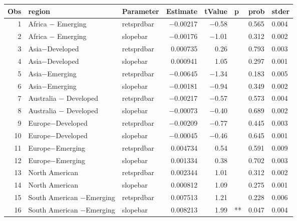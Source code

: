 

\begin{longtable}{|r|l|l|r|r|l|l|l|}\hline
   Obs &    region &    Parameter &    Estimate &    tValue &    p &    prob &    stder\\\hline
\endhead
   1 &    Africa $-$ Emerging &    retsprdbar &    $-$0.00217 &    $-$0.58 &      &    0.565 &    0.004\\\hline
   2 &    Africa $-$ Emerging &    slopebar &    $-$0.00176 &    $-$1.01 &      &    0.312 &    0.002\\\hline
   3 &    Asia$-$Developed &    retsprdbar &    0.000735 &    0.26 &      &    0.793 &    0.003\\\hline
   4 &    Asia$-$Developed &    slopebar &    0.000941 &    1.05 &      &    0.297 &    0.001\\\hline
   5 &    Asia$-$Emerging &    retsprdbar &    $-$0.00645 &    $-$1.34 &      &    0.183 &    0.005\\\hline
   6 &    Asia$-$Emerging &    slopebar &    $-$0.00181 &    $-$0.94 &      &    0.349 &    0.002\\\hline
   7 &    Australia $-$ Developed &    retsprdbar &    $-$0.00217 &    $-$0.57 &      &    0.573 &    0.004\\\hline
   8 &    Australia $-$ Developed &    slopebar &    $-$0.00073 &    $-$0.40 &      &    0.689 &    0.002\\\hline
   9 &    Europe$-$Developed &    retsprdbar &    $-$0.00209 &    $-$0.77 &      &    0.445 &    0.003\\\hline
   10 &    Europe$-$Developed &    slopebar &    $-$0.00045 &    $-$0.46 &      &    0.645 &    0.001\\\hline
   11 &    Europe$-$Emerging &    retsprdbar &    0.004734 &    0.54 &      &    0.591 &    0.009\\\hline
   12 &    Europe$-$Emerging &    slopebar &    0.001334 &    0.38 &      &    0.702 &    0.003\\\hline
   13 &    North American &    retsprdbar &    0.002344 &    1.01 &      &    0.312 &    0.002\\\hline
   14 &    North American &    slopebar &    0.000812 &    1.09 &      &    0.275 &    0.001\\\hline
   15 &    South American $-$Emerging &    retsprdbar &    0.007513 &    1.21 &      &    0.228 &    0.006\\\hline
   16 &    South American $-$Emerging &    slopebar &    0.008213 &    1.99 &    ** &    0.047 &    0.004\\\hline
\end{longtable}

